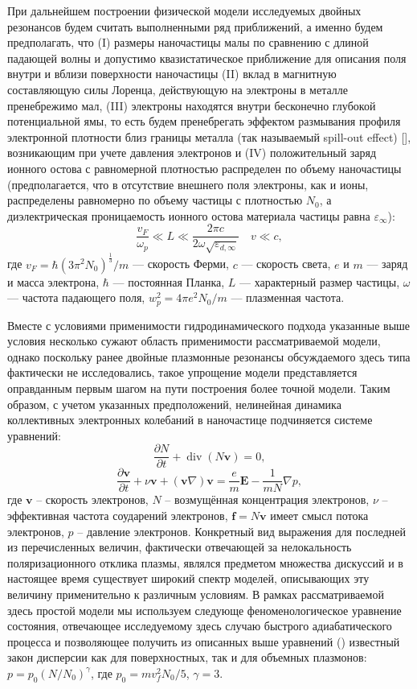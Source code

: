 \documentclass[12pt, a4paper]{article}
\renewcommand{\vec}{\mathbf}
\def \eps {\varepsilon}
\def \w {\omega}
\newcommand{\dt}[1]{\frac{\partial {#1}}{\partial t}}
\begin{document}
При дальнейшем построении физической модели исследуемых двойных резонансов будем считать выполненными ряд приближений, а именно будем предполагать, что (I) размеры наночастицы малы по сравнению с длиной падающей волны и допустимо квазистатическое приближение для описания поля внутри и вблизи поверхности наночастицы (II) вклад в магнитную составляющую силы Лоренца, действующую на электроны в металле пренебрежимо мал, (III) электроны находятся внутри бесконечно глубокой потенциальной ямы, то есть будем пренебрегать эффектом размывания профиля электронной плотности близ границы металла (так называемый spill-out effect) [], возникающим при учете давления электронов и (IV) положительный заряд ионного остова с равномерной плотностью распределен по объему наночастицы (предполагается, что в отсутствие внешнего поля электроны, как и ионы, распределены равномерно по объему частицы с плотностью $N_0$, а диэлектрическая проницаемость ионного остова материала частицы равна $\eps_\infty$): 
\begin{equation} 
\frac{v_F}{\omega_p} \ll L \ll \frac{2\pi c}{2\omega\sqrt{\eps_{d, \infty}}}  \quad v \ll c, 
\end{equation} 
где $v_F = \hbar (3 \pi^2 N_0)^\frac{1}{3}/m $ — скорость Ферми, $c$ — скорость света, $e$ и $m$ — заряд и масса электрона, $\hbar$ — постоянная Планка, $L$ — характерный размер частицы, $\w$ — частота падающего поля, $ w_p^2 = 4 \pi e^2 N_0 / m$  — плазменная частота.

Вместе с условиями применимости гидродинамического подхода указанные выше условия несколько сужают область применимости рассматриваемой модели, однако поскольку ранее двойные плазмонные резонансы обсуждаемого здесь типа фактически не исследовались, такое упрощение модели представляется оправданным первым шагом на пути построения более точной модели. Таким образом, с учетом указанных предположений, нелинейная динамика коллективных электронных колебаний в наночастице подчиняется системе уравнений:
\begin{equation} 
	\label{непрерывности}
	\dt{N} + \operatorname{div}(N \vec{v}) = 0,
\end{equation}
\begin{equation} 
	\label{гидродинамики}
	\dt{\vec{v}} + \nu \vec{v} +(\vec{v} \nabla)\vec{v} = \frac{e}{m}\vec{E} - \frac{1}{mN} \nabla p, 
\end{equation}
где $\vec{v}$ – скорость электронов, $N$ – возмущённая концентрация электронов, $\nu$ – эффективная частота соударений электронов, $\vec{f} = N \vec{v}$ имеет смысл потока электронов, $p$ – давление электронов. Конкретный вид выражения для последней из перечисленных величин, фактически отвечающей за нелокальность поляризационного отклика плазмы, являлся предметом множества дискуссий и в настоящее время существует широкий спектр моделей, описывающих эту величину применительно к различным условиям. В рамках рассматриваемой здесь простой модели мы используем следующе феноменологическое уравнение состояния, отвечающее исследуемому здесь случаю быстрого адиабатического процесса и позволяющее получить из описанных выше уравнений () известный закон дисперсии как для поверхностных, так и для объемных плазмонов:  $p = p_0 (N/N_0)^\gamma$, где $p_0 = m v_f^2 N_0/5$, $\gamma = 3$.
\end{document}
